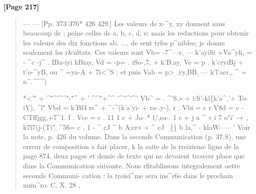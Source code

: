 \documentclass[11pt,a4paper]{book}
\begin{document}
\textbf{[Page 217]}\\[0.2cm]
\begin{quote}
--- ---
[Pp. 373 376* 426 429.] Les valeurs de x-\textasciicircum{}y, xy donnent sans beaucoup de
;
peine celles de a, b, c, d, e; mais les reductions pour obtenir les valeurs des dix
fonctions ab, ..., de sent trfes p\textasciicircum{}nibles; je donne seulement les r\&ultats. Ces valeurs sont
Vb=
-7\textasciicircum{}---r,
---
k'ayiSi
+Va\textasciicircum{}yh,
= -
\textasciicircum{}c -j\textasciicircum{} . IBa-iyi kBiay,
Vd = -p= . iSo-,7, + k'B,ay,
Ve = p . k'cryiBj + t'o-\textasciicircum{}yB,
ou
\textasciicircum{} =ya-A +
7i<\textasciicircum{}S
;
et puis
Vab = p> .yy,BB, --- k'l'acr,,
\textasciicircum{}
=
n\textasciicircum{}.\textasciicircum{}\textasciicircum{}\texttrademark\textasciicircum{})

*<'" + \textasciicircum{}"\textasciicircum{}'\textasciicircum{}\textasciicircum{}"-"\textasciicircum{} +
'
\textasciicircum{}\textasciicircum{}"+\textasciicircum{}\textasciicircum{} '\textasciicircum{}''\textasciicircum{}'\textasciicircum{}'
Vb\textasciicircum{} = . \textasciicircum{}'S,» + i:S'-kl\{k'a\textasciicircum{},'+ To-iY),
\textasciicircum{}l"
Vbd = k'Bf4 rs\textasciicircum{} + \textasciicircum{}-\textasciicircum{}(k'a'yi- + ra-.y-),
r .
Vbi = c
r
V8d = c -CTffjgg,+7\textasciicircum{}1.
f .
Vce = c . 11 1 c + Ja- * l/,ea-. 1 c + j a \textasciicircum{} « i 7 o"i' -+ , k7l7(j-(Ti",
\textasciicircum{}56= c . 1 - \textasciicircum{} cJ \textasciicircum{} b A;cr» + \textasciicircum{} cJ ~\{\} b la,\textasciicircum{} - klaW-
---
' Voir la note, p. 426 du volume. Dans la seconde Communication (p. 37.S), une erreur de composition
a fait placer, k la saite de la treizieme ligne de la page 874, deux pages et demie de texte qui ne devaient
trouver place que dans la Communication suivante. Nous rfitablissons integralement oette seconde Communi-
cation : la troisi\textasciicircum{}me sera ins\textasciicircum{}r6e dans le prochain num\textasciicircum{}ro.
C. X. 28
,
\end{quote}
\end{document}
